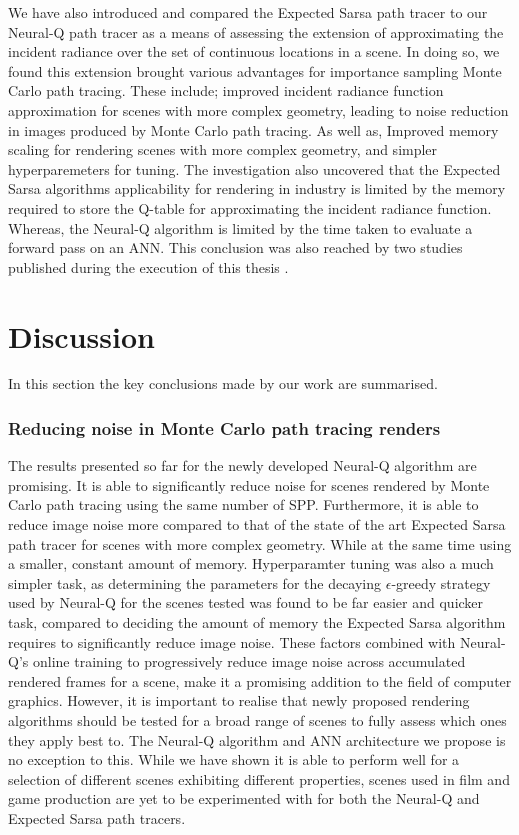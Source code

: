 \documentclass[../dissertation.tex]{subfiles}
\begin{document}
We have also introduced and compared the Expected Sarsa path tracer to our Neural-Q path tracer as a means of assessing the extension of approximating the incident radiance over the set of continuous locations in a scene. In doing so, we found this extension brought various advantages for importance sampling Monte Carlo path tracing. These include; improved incident radiance function approximation for scenes with more complex geometry, leading to noise reduction in images produced by Monte Carlo path tracing. As well as, Improved memory scaling for rendering scenes with more complex geometry, and simpler hyperparemeters for tuning. The investigation also uncovered that the Expected Sarsa algorithms applicability for rendering in industry is limited by the memory required to store the Q-table for approximating the incident radiance function. Whereas, the Neural-Q algorithm is limited by the time taken to evaluate a forward pass on an ANN. This conclusion was also reached by two studies published during the execution of this thesis \cite{keller2019integral, muller2018neural}.

\section{Discussion}

In this section the key conclusions made by our work are summarised. 

\subsubsection*{Reducing noise in Monte Carlo path tracing renders}
The results presented so far for the newly developed Neural-Q algorithm are promising. It is able to significantly reduce noise for scenes rendered by Monte Carlo path tracing using the same number of SPP. Furthermore, it is able to reduce image noise more compared to that of the state of the art Expected Sarsa path tracer for scenes with more complex geometry. While at the same time using a smaller, constant amount of memory. Hyperparamter tuning was also a much simpler task, as determining the parameters for the decaying $\epsilon$-greedy strategy used by Neural-Q for the scenes tested was found to be far easier and quicker task, compared to deciding the amount of memory the Expected Sarsa algorithm requires to significantly reduce image noise. These factors combined with Neural-Q's online training to progressively reduce image noise across accumulated rendered frames for a scene, make it a promising addition to the field of computer graphics. However, it is important to realise that newly proposed rendering algorithms should be tested for a broad range of scenes to fully assess which ones they apply best to. The Neural-Q algorithm and ANN architecture we propose is no exception to this. While we have shown it is able to perform well for a selection of different scenes exhibiting different properties, scenes used in film and game production are yet to be experimented with for both the Neural-Q and Expected Sarsa path tracers.
\end{document}
